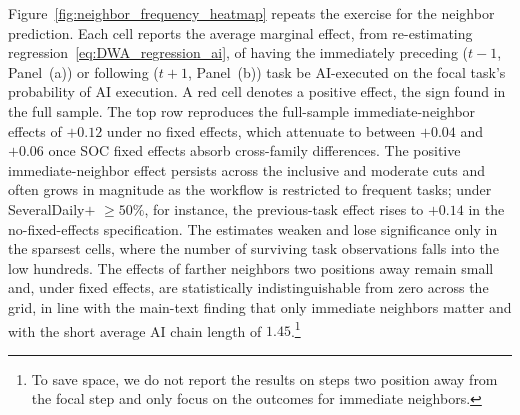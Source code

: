 Figure~\ref{fig:neighbor_frequency_heatmap} repeats the exercise for the neighbor prediction.
Each cell reports the average marginal effect, from re-estimating regression~\eqref{eq:DWA_regression_ai}, of having the immediately preceding ($t{-}1$, Panel~(a)) or following ($t{+}1$, Panel~(b)) task be AI-executed on the focal task's probability of AI execution.
A red cell denotes a positive effect, the sign found in the full sample.
The top row reproduces the full-sample immediate-neighbor effects of $+0.12$ under no fixed effects, which attenuate to between $+0.04$ and $+0.06$ once SOC fixed effects absorb cross-family differences.
The positive immediate-neighbor effect persists across the inclusive and moderate cuts and often grows in magnitude as the workflow is restricted to frequent tasks; under SeveralDaily$+$ $\geq 50\%$, for instance, the previous-task effect rises to $+0.14$ in the no-fixed-effects specification.
The estimates weaken and lose significance only in the sparsest cells, where the number of surviving task observations falls into the low hundreds.
The effects of farther neighbors two positions away remain small and, under fixed effects, are statistically indistinguishable from zero across the grid, in line with the main-text finding that only immediate neighbors matter and with the short average AI chain length of $1.45$.\footnote{ To save space, we do not report the results on steps two position away from the focal step and only focus on the outcomes for immediate neighbors.}

